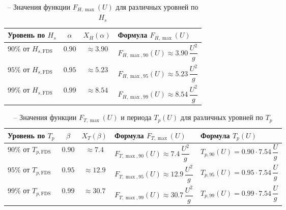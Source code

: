 \begin{landscape}
    \begin{table}
        \caption{-- Значения функции $F_{H,\max}(U)$ для различных уровней по $H_s$}
        \label{tab:hs_levels_FHmax}
        \centering
        \begin{tabular}{l c c l}
            \toprule
            \textbf{Уровень по $H_s$} &
            \boldmath$\alpha$\unboldmath &
            \boldmath$X_H(\alpha)$\unboldmath &
            \textbf{Формула $F_{H,\max}(U)$} \\
            \midrule

            $90\%$ от $H_{s,\mathrm{FDS}}$ &
            $0{.}90$ &
            $\approx 3{.}90$ &
            $F_{H,\max,90}(U) \approx 3{.}90\,\dfrac{U^2}{g}$ \\

            $95\%$ от $H_{s,\mathrm{FDS}}$ &
            $0{.}95$ &
            $\approx 5{.}23$ &
            $F_{H,\max,95}(U) \approx 5{.}23\,\dfrac{U^2}{g}$ \\

            $99\%$ от $H_{s,\mathrm{FDS}}$ &
            $0{.}99$ &
            $\approx 8{.}54$ &
            $F_{H,\max,99}(U) \approx 8{.}54\,\dfrac{U^2}{g}$ \\

            \bottomrule
        \end{tabular}
    \end{table}

    \begin{table}
        \caption{-- Значения функции $F_{T,\max}(U)$ и периода $T_p(U)$ для различных уровней по $T_p$}
        \label{tab:tp_levels_FTmax}
        \centering
        \begin{tabular}{l c c l l}
            \toprule
            \textbf{Уровень по $T_p$} &
            \boldmath$\beta$\unboldmath &
            \boldmath$X_T(\beta)$\unboldmath &
            \textbf{Формула $F_{T,\max}(U)$} &
            \textbf{Формула $T_p(U)$} \\
            \midrule
            $90\%$ от $T_{p,\mathrm{FDS}}$ &
            $0{.}90$ &
            $\approx 7{.}4$ &
            $F_{T,\max,90}(U) \approx 7{.}4\,\dfrac{U^2}{g}$ &
            $T_{p,90}(U) = 0{.}90 \cdot 7{.}54\,\dfrac{U}{g}$ \\
            $95\%$ от $T_{p,\mathrm{FDS}}$ &
            $0{.}95$ &
            $\approx 12{.}9$ &
            $F_{T,\max,95}(U) \approx 12{.}9\,\dfrac{U^2}{g}$ &
            $T_{p,95}(U) = 0{.}95 \cdot 7{.}54\,\dfrac{U}{g}$ \\
            $99\%$ от $T_{p,\mathrm{FDS}}$ &
            $0{.}99$ &
            $\approx 30{.}7$ &
            $F_{T,\max,99}(U) \approx 30{.}7\,\dfrac{U^2}{g}$ &
            $T_{p,99}(U) = 0{.}99 \cdot 7{.}54\,\dfrac{U}{g}$ \\
            \bottomrule
        \end{tabular}
    \end{table}
\end{landscape}

